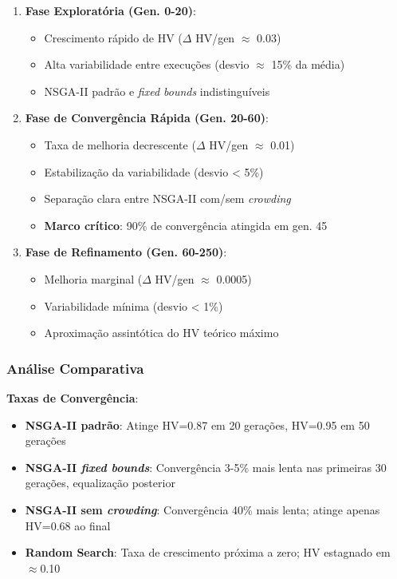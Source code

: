 \begin{enumerate}
    \item \textbf{Fase Exploratória (Gen. 0-20)}: 
    \begin{itemize}
        \item Crescimento rápido de HV ($\Delta$ HV/gen $\approx$ 0.03)
        \item Alta variabilidade entre execuções (desvio $\approx$ 15\% da média)
        \item NSGA-II padrão e \textit{fixed bounds} indistinguíveis
    \end{itemize}
    
    \item \textbf{Fase de Convergência Rápida (Gen. 20-60)}:
    \begin{itemize}
        \item Taxa de melhoria decrescente ($\Delta$ HV/gen $\approx$ 0.01)
        \item Estabilização da variabilidade (desvio < 5\%)
        \item Separação clara entre NSGA-II com/sem \textit{crowding}
        \item \textbf{Marco crítico}: 90\% de convergência atingida em gen. 45
    \end{itemize}
    
    \item \textbf{Fase de Refinamento (Gen. 60-250)}:
    \begin{itemize}
        \item Melhoria marginal ($\Delta$ HV/gen $\approx$ 0.0005)
        \item Variabilidade mínima (desvio < 1\%)
        \item Aproximação assintótica do HV teórico máximo
    \end{itemize}
\end{enumerate}

\subsubsection{Análise Comparativa}

\textbf{Taxas de Convergência}:
\begin{itemize}
    \item \textbf{NSGA-II padrão}: Atinge HV=0.87 em 20 gerações, HV=0.95 em 50 gerações
    \item \textbf{NSGA-II \textit{fixed bounds}}: Convergência 3-5\% mais lenta nas primeiras 30 gerações, equalização posterior
    \item \textbf{NSGA-II sem \textit{crowding}}: Convergência 40\% mais lenta; atinge apenas HV=0.68 ao final
    \item \textbf{Random Search}: Taxa de crescimento próxima a zero; HV estagnado em $\approx$0.10
\end{itemize}

